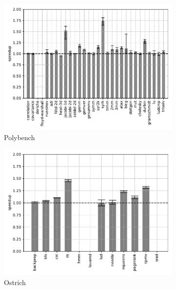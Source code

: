 \begin{figure}
    \centering
    \begin{subfigure}[t]{\textwidth}
        \includegraphics[width=\textwidth]
        {Images/6.1.RQ1/polybench-wasmtime-simd.pdf}
        \caption{Polybench}
    \end{subfigure}
    \begin{subfigure}[t]{.45\textwidth}
        \includegraphics[width=\textwidth]
        {Images/6.1.RQ1/ostrich-wasmtime-simd.pdf}
        \caption{Ostrich}
    \end{subfigure}
    \begin{subfigure}[t]{.45\textwidth}

\end{subfigure}
\end{figure}
